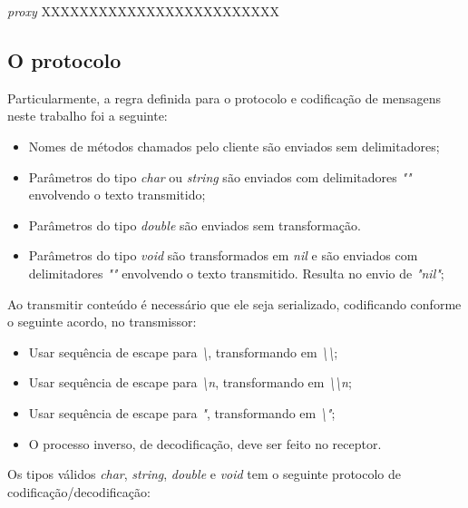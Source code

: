 \documentclass[11pt]{article}
\begin{document}
\textit{proxy}
XXXXXXXXXXXXXXXXXXXXXXXXX

\subsection{O protocolo}\label{subsec:proto}

Particularmente, a regra definida para o protocolo e codificação de mensagens
neste trabalho foi a seguinte:

\begin{itemize}
\item
Nomes de métodos chamados pelo cliente são enviados sem delimitadores;
\item
Parâmetros do tipo \textit{char} ou \textit{string} são enviados com delimitadores
\textit{""} envolvendo o texto transmitido;
\item
Parâmetros do tipo \textit{double} são enviados sem transformação.
\item
Parâmetros do tipo \textit{void} são transformados em \textit{nil} e são enviados
com delimitadores \textit{""} envolvendo o texto transmitido. Resulta no envio
de \textit{"nil"};
\end{itemize}

Ao transmitir conteúdo é necessário que ele seja serializado, codificando
conforme o seguinte acordo, no transmissor:

\begin{itemize}
\item
Usar sequência de escape para \textit{\textbackslash{}}, transformando em \textit{\textbackslash{}\textbackslash{}};
\item
Usar sequência de escape para \textit{\textbackslash{}n}, transformando em \textit{\textbackslash{}\textbackslash{}n};
\item
Usar sequência de escape para \textit{"}, transformando em \textit{\textbackslash{}"};
\item
O processo inverso, de decodificação, deve ser feito no receptor.
\end{itemize}

Os tipos válidos \textit{char}, \textit{string}, \textit{double} e
\textit{void} tem o seguinte protocolo de codificação/decodificação:
\end{document}
